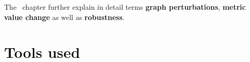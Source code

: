 The~ chapter further explain in detail terms \textbf{graph perturbations}, \textbf{metric value change} as well as \textbf{robustness}.

\section{Tools used}


